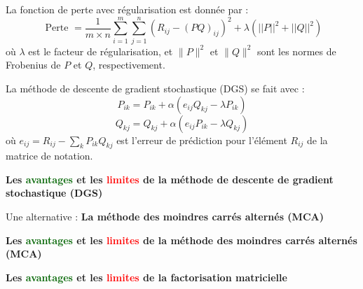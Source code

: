 \begin{frame}{\PartII}
	La fonction de perte avec régularisation est donnée par :
	\begin{equation*}
		\text { Perte }=\frac{1}{m \times n} \sum_{i=1}^m \sum_{j=1}^n\left(R_{i j}-(P Q)_{i j}\right)^2+\lambda\left(||P||^2+||Q||^2\right)
	\end{equation*}
	où $\lambda$ est le facteur de régularisation, et $\|P\|^2$ et $\|Q\|^2$ sont les normes de Frobenius de $P$ et $Q$, respectivement.
\end{frame}

\begin{frame}{\PartII}
	La méthode de descente de gradient stochastique (DGS) se fait avec :
	\begin{equation*}
		P_{i k}=P_{i k}+\alpha\left(e_{i j} Q_{k j}-\lambda P_{i k}\right)
	\end{equation*}
	\begin{equation*}
		Q_{k j}=Q_{k j}+\alpha\left(e_{i j} P_{i k}-\lambda Q_{k j}\right)
	\end{equation*}
	où $e_{i j}=R_{i j}-\sum_k P_{i k} Q_{k j}$ est l'erreur de prédiction pour l'élément $R_{i j}$ de la matrice de notation.
\end{frame}

\begin{frame}{\PartII}
	\begin{center}
		\textbf{\large{Les \textcolor{darkgreen}{avantages} et les \textcolor{red}{limites} de la méthode de descente de gradient stochastique (DGS)}}
	\end{center}
\end{frame}

\begin{frame}{\PartII}
	\begin{center}
		\large{Une alternative : \textbf{La méthode des moindres carrés alternés (MCA)}}
	\end{center}
\end{frame}

\begin{frame}{\PartII}
	\begin{center}
		\textbf{\large{Les \textcolor{darkgreen}{avantages} et les \textcolor{red}{limites} de la méthode des moindres carrés alternés (MCA)}}
	\end{center}
\end{frame}

\begin{frame}{\PartII}
	\begin{center}
		\textbf{\large{Les \textcolor{darkgreen}{avantages} et les \textcolor{red}{limites} de la factorisation matricielle}}
	\end{center}
\end{frame}